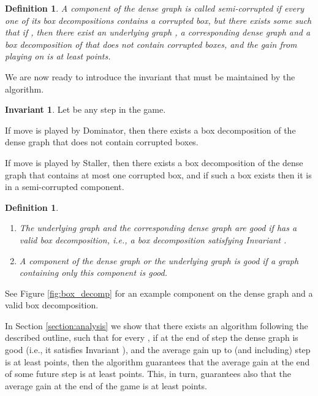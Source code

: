 \documentclass[11pt]{article}
\def\dnsitem{\vspace{-7pt}\item}
\newtheorem{definition}[theorem]{Definition}
\theoremstyle{definition}
\newtheorem*{tinvboxes*}{Invariant }
\begin{document}
\begin{definition}
A component  of the dense graph  is called \emph{semi-corrupted} if every one of its box decompositions contains a corrupted box, 
but there exists some  such that if , then there exist an underlying graph , a corresponding dense graph  and a box decomposition  of  that does not contain corrupted boxes, and the gain from playing  on  is at least  points.
\end{definition}

We are now ready to introduce the invariant that must be maintained by the algorithm.

\begin{tinvboxes*}
Let  be any step in the game.
\begin{description}
	\dnsitem[.] If move  is played by Dominator, then there exists a box decomposition  of the dense graph  that does not contain corrupted boxes.
	\dnsitem[.] If move  is played by Staller, then there exists a box decomposition  of the dense graph  that contains at most one corrupted box, 
	and if such a box exists then it is in a semi-corrupted component.
\end{description}
\end{tinvboxes*}

\begin{definition}
\label{def:good_graph_valid_box_decomp}

\begin{enumerate}
	\dnsitem The underlying graph  and the corresponding dense graph  are \emph{good} if  has a \emph{valid} box decomposition, i.e., a box decomposition satisfying Invariant .
	\dnsitem A component  of the dense graph  or the underlying graph  is \emph{good} if a graph containing only this component is good.
\end{enumerate}
\end{definition}

See Figure \ref{fig:box_decomp} for an example component on the dense graph and a valid box decomposition.

In Section \ref{section:analysis} we show that there exists an algorithm following the described outline, such that for every , if at the end of step  the dense graph is good (i.e., it satisfies Invariant ), and the average gain up to (and including) step  is at least  points, then the algorithm guarantees that the average gain at the end of 
some future step  
is at least  points.
This, in turn, guarantees also that the average gain at the end of the game is at least  points.
\end{document}
